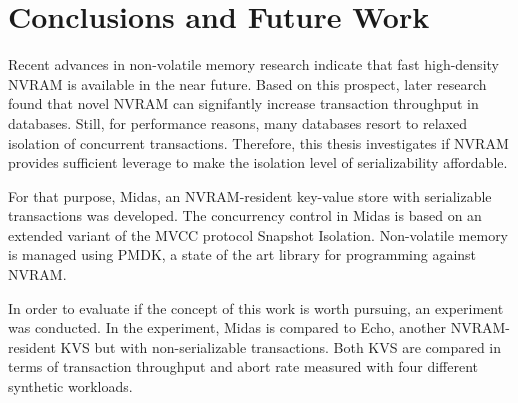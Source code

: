 \chapter{Conclusions and Future Work}
\label{ch:summary}

Recent advances in non-volatile memory research indicate that fast high-density
NVRAM is available in the near future. Based on this prospect, later research
found that novel NVRAM can signifantly increase transaction throughput in
databases. Still, for performance reasons, many databases resort to relaxed
isolation of concurrent transactions. Therefore, this thesis investigates if
NVRAM provides sufficient leverage to make the isolation level of
serializability affordable.

For that purpose, Midas, an NVRAM-resident key-value store with serializable
transactions was developed. The concurrency control  in Midas is based on an
extended variant of the MVCC protocol Snapshot Isolation. Non-volatile memory is
managed using PMDK, a state of the art library for programming against NVRAM.

In order to evaluate if the concept of this work is worth pursuing, an
experiment was conducted. In the experiment, Midas is compared to Echo, another
NVRAM-resident KVS but with non-serializable transactions. Both KVS are compared
in terms of transaction throughput and abort rate measured with four different
synthetic workloads.


%
